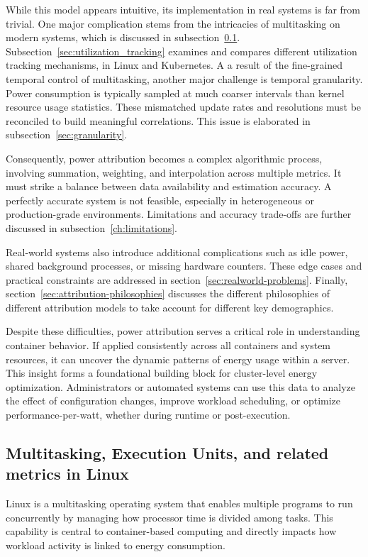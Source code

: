 While this model appears intuitive, its implementation in real systems is far from trivial. One major complication stems from the intricacies of multitasking on modern systems, which is discussed in subsection~\ref{sec:linux-multitasking}. Subsection~\ref{sec:utilization_tracking} examines and compares different utilization tracking mechanisms, in Linux and Kubernetes. A a result of the fine-grained temporal control of multitasking, another major challenge is temporal granularity. Power consumption is typically sampled at much coarser intervals than kernel resource usage statistics. These mismatched update rates and resolutions must be reconciled to build meaningful correlations. This issue is elaborated in subsection~\ref{sec:granularity}.

Consequently, power attribution becomes a complex algorithmic process, involving summation, weighting, and interpolation across multiple metrics. It must strike a balance between data availability and estimation accuracy. A perfectly accurate system is not feasible, especially in heterogeneous or production-grade environments. Limitations and accuracy trade-offs are further discussed in subsection~\ref{ch:limitations}.

Real-world systems also introduce additional complications such as idle power, shared background processes, or missing hardware counters. These edge cases and practical constraints are addressed in section~\ref{sec:realworld-problems}. Finally, section~\ref{sec:attribution-philosophies} discusses the different philosophies of different attribution models to take account for different key demographics.

Despite these difficulties, power attribution serves a critical role in understanding container behavior. If applied consistently across all containers and system resources, it can uncover the dynamic patterns of energy usage within a server. This insight forms a foundational building block for cluster-level energy optimization. Administrators or automated systems can use this data to analyze the effect of configuration changes, improve workload scheduling, or optimize performance-per-watt, whether during runtime or post-execution.

\subsection{Multitasking, Execution Units, and related metrics in Linux}
\label{sec:linux-multitasking}
Linux is a multitasking operating system that enables multiple programs to run concurrently by managing how processor time is divided among tasks. This capability is central to container-based computing and directly impacts how workload activity is linked to energy consumption.

